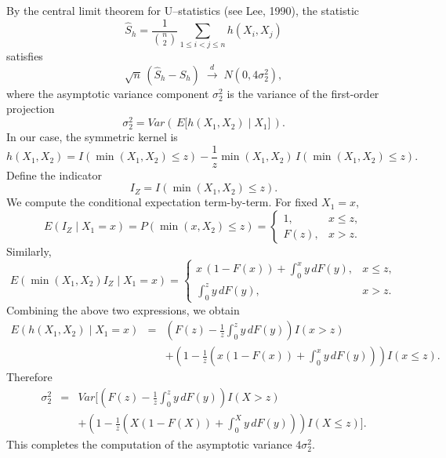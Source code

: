 \documentclass[11pt]{article}
\begin{document}

By the central limit theorem for U--statistics (see Lee, 1990), the statistic
$$
\widehat S_h=\frac{1}{\binom{n}{2}}\sum_{1\le i<j\le n} h(X_i,X_j)
$$
satisfies
$$
\sqrt{n}\,(\widehat S_h - S_h)\;\xrightarrow{d}\; N(0,4\sigma_2^2),
$$
where the asymptotic variance component $\sigma_2^2$ is the variance of the first-order projection
$$
\sigma_2^2=Var\left(\,E\big[h(X_1,X_2)\mid X_1\big]\,\right).
$$
In our case, the symmetric kernel is
$$h(X_1,X_2)
= I\!\left(\min(X_1,X_2)\le z\right)
- \frac{1}{z}\min(X_1,X_2)\,I\!\left(\min(X_1,X_2)\le z\right).$$
Define the indicator
$$
I_Z = I\!\left(\min(X_1,X_2)\le z\right).
$$
We compute the conditional expectation term-by-term.
For fixed $X_1=x$,
$$
E(I_Z\mid X_1=x)
=
P\!\left(\min(x,X_2)\le z\right)
=
\begin{cases}
1, & x\le z,\\[4pt]
F(z), & x>z.
\end{cases}
$$
Similarly,
$$
E\!\left(\min(X_1,X_2) I_Z \mid X_1=x\right)
=
\begin{cases}
x\,(1-F(x))+\displaystyle\int_0^{x} y\,dF(y), & x\le z,\\[10pt]
\displaystyle\int_0^{z} y\,dF(y), & x>z.
\end{cases}
$$
Combining the above two  expressions, we obtain
\begin{eqnarray*}
    E\!\left(h(X_1,X_2)\mid X_1=x\right)&=&
\left(F(z)-\frac{1}{z}\int_0^z y\,dF(y)\right) I(x>z)
\\
&&+\left(1-\frac{1}{z}\left(x(1-F(x))+\int_0^{x} y\,dF(y)\right)\right) I(x\le z).
\end{eqnarray*}Therefore
\begin{eqnarray*}
    \sigma_2^2
&=&Var\Bigg[
\left(F(z)-\frac{1}{z}\int_0^z y\,dF(y)\right) I(X>z)
\\&&+\left(1-\frac{1}{z}\left(X(1-F(X))+\int_0^{X} y\,dF(y)\right)\right) I(X\le z)
\Bigg].
\end{eqnarray*}
This completes the computation of the asymptotic variance $4\sigma_2^2$.

\end{document}
